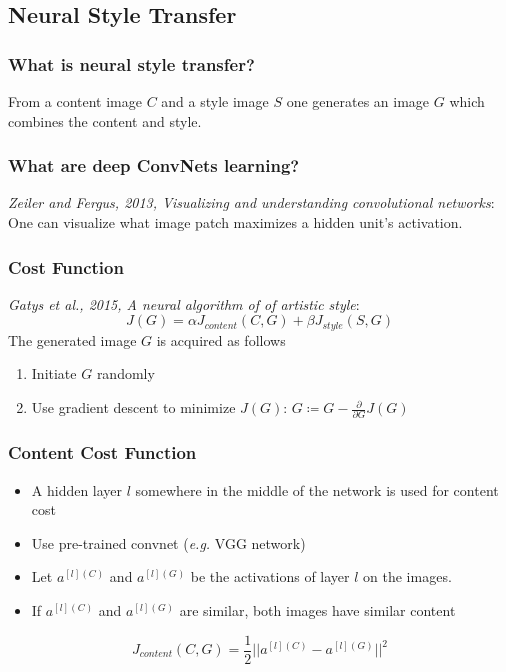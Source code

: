\documentclass{article}
\begin{document}
\subsection{Neural Style Transfer}
\subsubsection{What is neural style transfer?}
From a content image $C$ and a style image $S$ one generates an image $G$ which combines the content and style.

\subsubsection{What are deep ConvNets learning?}
\emph{Zeiler and Fergus, 2013, Visualizing and understanding convolutional networks}:
One can visualize what image patch maximizes a hidden unit's activation.

\subsubsection{Cost Function}
\emph{Gatys et al., 2015, A neural algorithm of of artistic style}:
\begin{equation}
  J(G)=\alpha J_{content}(C, G)+\beta J_{style}(S, G)
\end{equation}
The generated image $G$ is acquired as follows
\begin{enumerate}
  \item Initiate $G$ randomly
  \item Use gradient descent to minimize $J(G)$: $G\coloneqq G-\frac{\partial}{\partial G}J(G)$
\end{enumerate}

\subsubsection{Content Cost Function}
\begin{itemize}
  \item A hidden layer $l$ somewhere in the middle of the network is used for content cost
  \item Use pre-trained convnet (\emph{e.g.} VGG network)
  \item Let $a^{[l](C)}$ and $a^{[l](G)}$ be the activations of layer $l$ on the images.
  \item If $a^{[l](C)}$ and $a^{[l](G)}$ are similar, both images have similar content
\end{itemize}
\begin{equation}
  J_{content}(C, G) = \frac{1}{2} ||a^{[l](C)} - a^{[l](G)}||^2
\end{equation}
\end{document}
